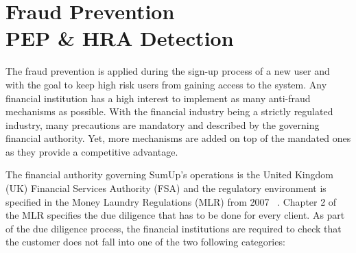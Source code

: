 \documentclass[a4paper, oneside]{csthesis}
\begin{document}








\chapter{Fraud Prevention \\PEP \& HRA Detection}

The fraud prevention is applied during the sign-up process of a new user and with the goal to keep high risk users from gaining access to the system.
Any financial institution has a high interest to implement as many anti-fraud mechanisms as possible. With the financial industry being a strictly regulated industry, many precautions are mandatory and described by the governing financial authority. Yet, more mechanisms are added on top of the mandated ones as they provide a competitive advantage.

The financial authority governing SumUp's operations is the United Kingdom (UK) Financial Services Authority (FSA) and the regulatory environment is specified in the Money Laundry Regulations (MLR) from 2007 ~\cite{website:aml-regulations-2007}. Chapter 2 of the MLR specifies the due diligence that has to be done for every client. As part of the due diligence process, the financial institutions are required to check that the customer does not fall into one of the two following categories:
\end{document}
